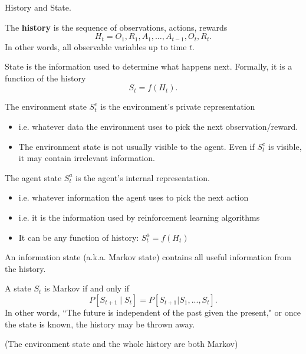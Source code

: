 \documentclass[english]{article}
\begin{document}
\item {History and State}.
\begin{definition}[History]
The \textbf{history} is the sequence of observations, actions, rewards
\[ H_t = O_1, R_1, A_1, \dots, A_{t-1}, O_t, R_t. \]
In other words, all observable variables up to time $t$.
\end{definition}

\begin{definition}[State]
State is the information used to determine what happens next. Formally, it is a function of the history
\[ S_t = f(H_t). \]
\end{definition}

\begin{definition}
The environment state $S^e_t$
is the environment's private representation
\begin{itemize}
    \item i.e. whatever data the
environment uses to pick the
next observation/reward.
    \item The environment state is not
usually visible to the agent.
Even if $S^e_t$
is visible, it may
contain irrelevant
information.
\end{itemize}
\end{definition}

\begin{definition}
The agent state $S^a_t$
is the
agent's internal
representation.
\begin{itemize}
    \item i.e. whatever information
the agent uses to pick the
next action
    \item i.e. it is the information
used by reinforcement
learning algorithms
    \item It can be any function of
history: $S^a_t= f (H_t)$
\end{itemize}
\end{definition}

\begin{definition}
    An information state (a.k.a. Markov state) contains all useful
information from the history.
\end{definition}

\begin{definition}
A state $S_t$ is Markov if and only if
\[ P[S_{t+1} \mid S_t] = P[S_{t+1} | S_1, ..., S_t]. \]
In other words, ``The future is independent of the past given the present," or once the state is known, the history may be thrown away.
\end{definition}
(The environment state and the whole history are both Markov)
\end{document}
